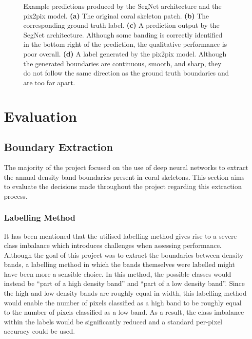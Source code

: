 \begin{figure}[!t]
\begin{subfigure}[t]{0.24\textwidth}
        \caption{}
        \label{fig:pixexample}
    \end{subfigure}
    \caption{Example predictions produced by the SegNet architecture and the pix2pix model. \textbf{(a)} The original coral skeleton patch. \textbf{(b)} The corresponding ground truth label. \textbf{(c)} A prediction output by the SegNet architecture. Although some banding is correctly identified in the bottom right of the prediction, the qualitative performance is poor overall. \textbf{(d)} A label generated by the pix2pix model. Although the generated boundaries are continuous, smooth, and sharp, they do not follow the same direction as the ground truth boundaries and are too far apart.}
    \label{fig:segpixexample}
\end{figure}

\section{Evaluation}

\subsection{Boundary Extraction}

The majority of the project focused on the use of deep neural networks to extract the annual density band boundaries present in coral skeletons. This section aims to evaluate the decisions made throughout the project regarding this extraction process.

\subsubsection{Labelling Method}
\label{sec:evallabel}

It has been mentioned that the utilised labelling method gives rise to a severe class imbalance which introduces challenges when assessing performance. Although the goal of this project was to extract the boundaries between density bands, a labelling method in which the bands themselves were labelled might have been more a sensible choice. In this method, the possible classes would instead be ``part of a high density band'' and ``part of a low density band''. Since the high and low density bands are roughly equal in width, this labelling method would enable the number of pixels classified as a high band to be roughly equal to the number of pixels classified as a low band. As a result, the class imbalance within the labels would be significantly reduced and a standard per-pixel accuracy could be used.

